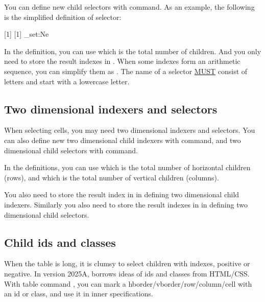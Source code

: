 \documentclass[oneside]{book}
\begin{document}
{You can define new child selectors with \CC{\NewTblrChildSelector} command.
As an example, the following is the simplified definition of  selector:
\begin{codehigh}
\ExplSyntaxOn
{} [1] [1]
  {
    \clist_set:Ne 
  }
\ExplSyntaxOff
\end{codehigh}
In the definition, you can use \CC{\lTblrChildTotalInt} which is the total number of children.
And you only need to store the result indexes in \CC{\lTblrChildClist}.
When some indexes form an arithmetic sequence,
you can simplify them as .
The name of a selector \underline{MUST} consist of letters and start with a lowercase letter.

\subsection{Two dimensional indexers and selectors}

When selecting cells, you may need two dimensional indexers and selectors.
You can also define new two dimensional child indexers with \CC{\NewTblrChildIndexer} command,
and two dimensional child selectors with \CC{\NewTblrChildSelector} command.

In the definitions, you can use \CC{\lTblrChildHtotalInt}
which is the total number of horizontal children (rows), and \CC{\lTblrChildVtotalInt}
which is the total number of vertical children (columns).

You also need to store the result index  in \CC{\lTblrChildIndexTl}
in defining two dimensional child indexers.
Similarly you also need to store the result indexes in \CC{\lTblrChildClist}
in defining two dimensional child selectors.

\subsection{Child ids and classes}

When the table is long, it is clumsy to select children with indexes, positive or negative.
In version 2025A,  borrows ideas of ids and classes from HTML/CSS.
With table command \CC{\SetChild}, you can mark a hborder/vborder/row/column/cell with
an id or class, and use it in inner specifications.

}
\end{document}

